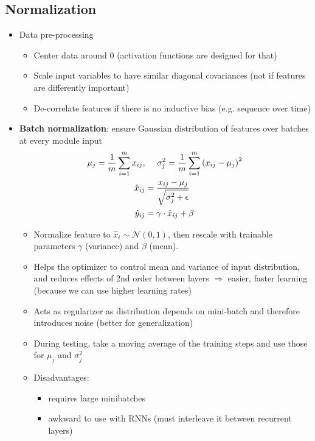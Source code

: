 \subsection{Normalization}
\begin{itemize}
	\item Data pre-processing
	\begin{itemize}
		\item Center data around 0 (activation functions are designed for that)
		\item Scale input variables to have similar diagonal covariances (not if features are differently important)
		\item De-correlate features if there is no inductive bias (e.g. sequence over time)
	\end{itemize}
	\item \textbf{Batch normalization}: ensure Gaussian distribution of features over batches at every module input
	\begin{equation*}
		\begin{split}
			\mu_j = \frac{1}{m} \sum_{i=1}^{m} x_{ij}, &\hspace{5mm} \sigma_j^2 = \frac{1}{m} \sum_{i=1}^{m} \left(x_{ij} - \mu_j\right)^2 \\
			\hat{x}_{ij} & = \frac{x_{ij} - \mu_j}{\sqrt{\sigma_j^2 + \epsilon}} \\
			\hat{y}_{ij} & = \gamma \cdot \hat{x}_{ij} + \beta
		\end{split}
	\end{equation*}
	\begin{itemize}
		\item Normalize feature to $\hat{x}_i \sim \mathcal{N}(0,1)$, then rescale with trainable parameters $\gamma$ (variance) and $\beta$ (mean).
		\item Helps the optimizer to control mean and variance of input distribution, and reduces effects of 2nd order between layers $\Rightarrow$ easier, faster learning (because we can use higher learning rates)
		\item Acts as regularizer as distribution depends on mini-batch and therefore introduces noise (better for generalization)
		\item During testing, take a moving average of the training steps and use those for $\mu_j$ and $\sigma_j^2$
		\item Disadvantages:
		\begin{itemize}
			\item requires large minibatches
			\item awkward to use with RNNs (must interleave it between recurrent layers)

\end{itemize}
\end{itemize}
\end{itemize}
